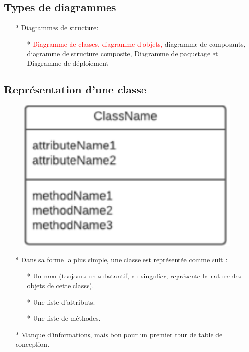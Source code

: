 \documentclass[12pt]{article}
\begin{document}
\subsection{Types de diagrammes}
\begin{itemize}
	\item[* ]  Diagrammes de structure:
	\begin{itemize}
		\item[* ] \textcolor{red}{Diagramme de classes, diagramme d'objets,} diagramme de composants, diagramme de structure composite,
		Diagramme de paquetage et Diagramme de déploiement
	\end{itemize}
\end{itemize}
\subsection{Représentation d'une classe}
\begin{figure}[!hbtp]
	\centering
	\includegraphics[scale=0.75]{Capture1.PNG}
\end{figure}
\begin{itemize}
	\item[* ] Dans sa forme la plus simple, une classe est représentée comme suit :
	\begin{itemize}
		\item[* ] Un nom (toujours un substantif, au singulier, représente la
		nature des objets de cette classe).
		\item[* ] Une liste d'attributs.
		\item[* ] Une liste de méthodes.
	\end{itemize}
\item[* ] Manque d'informations, mais bon pour un premier tour de table de
conception.
\end{itemize}
\end{document}

